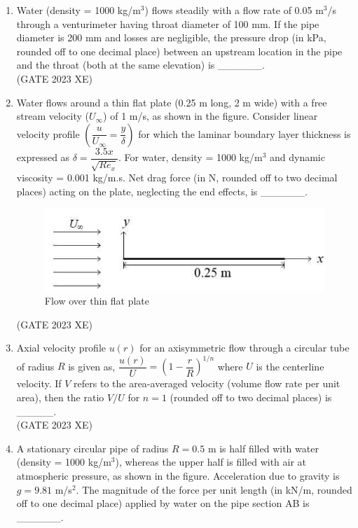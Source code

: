 \documentclass[journal,12pt,onecolumn]{IEEEtran}
\begin{document}
\begin{enumerate}
\item Water (density = 1000 kg/m$^3$) flows steadily with a flow rate of 0.05 m$^3$/s through
a venturimeter having throat diameter of 100 mm. If the pipe diameter is 200 mm
and losses are negligible, the pressure drop (in kPa, rounded off to one decimal
place) between an upstream location in the pipe and the throat (both at the same
elevation) is \_\_\_\_\_\_.\\
\hfill{(GATE 2023 XE)}

\item Water flows around a thin flat plate (0.25 m long, 2 m wide) with a free stream
velocity ($U_\infty$) of 1 m/s, as shown in the figure. Consider linear velocity profile
$\left(\dfrac{u}{U_\infty}=\dfrac{y}{\delta}\right)$ for which the laminar boundary layer thickness is expressed as
$\delta=\dfrac{3.5x}{\sqrt{Re_x}}$. For water, density = 1000 kg/m$^3$ and dynamic viscosity = 0.001
kg/m.s. Net drag force (in N, rounded off to two decimal places) acting on the
plate, neglecting the end effects, is \_\_\_\_\_\_.\\

\begin{figure}[htbp]
\centering
\includegraphics[width=0.8\columnwidth]{figs/B/fig11.png}
\caption{Flow over thin flat plate}
\label{fig:figs/B/fig11.png}
\end{figure}
\hfill{(GATE 2023 XE)}

\item Axial velocity profile $u(r)$ for an axisymmetric flow through a circular tube of
radius $R$ is given as, $\dfrac{u(r)}{U}=\left(1-\dfrac{r}{R}\right)^{1/n}$ where $U$ is the centerline velocity. If $V$
refers to the area-averaged velocity (volume flow rate per unit area), then the ratio
$V/U$ for $n=1$ (rounded off to two decimal places) is \_\_\_\_\_.\\
\hfill{(GATE 2023 XE)}

\newpage

\item A stationary circular pipe of radius $R=0.5$ m is half filled with water (density =
1000 kg/m$^3$), whereas the upper half is filled with air at atmospheric pressure, as
shown in the figure. Acceleration due to gravity is $g=9.81$ m/s$^2$. The magnitude
of the force per unit length (in kN/m, rounded off to one decimal place) applied by
water on the pipe section AB is \_\_\_\_\_\_.\\


\end{enumerate}
\end{document}
